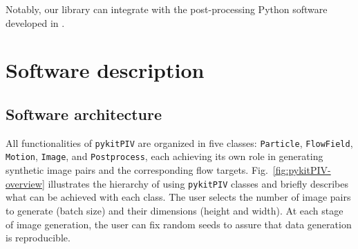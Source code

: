 \documentclass[a4paper,fleqn]{cas-dc}
\newcommand{ \kamila}[1]{\color{blue}{Kamila: #1} \color{black}}
\begin{document}
Notably, our library can integrate with the post-processing Python software developed in \cite{aguilar2022dpivsoft}.



\section{Software description} \label{sec:software}



\subsection{Software architecture}

All functionalities of \texttt{pykitPIV} are organized in five classes: \texttt{Particle}, \texttt{FlowField}, \texttt{Motion}, \texttt{Image}, and \texttt{Postprocess}, each achieving its own role in generating synthetic image pairs and the corresponding flow targets. Fig.~\ref{fig:pykitPIV-overview} illustrates the hierarchy of using \texttt{pykitPIV} classes and briefly describes what can be achieved with each class. The user selects the number of image pairs to generate (batch size) and their dimensions (height and width). At each stage of image generation, the user can fix random seeds to assure that data generation is reproducible.

\kamila{Mention that image properties are Monte Carlo -generated! We can show the span of conditions generated.}
\end{document}
